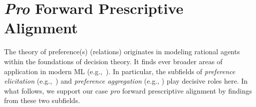 \documentclass{article}
\theoremstyle{plain}
\theoremstyle{definition}
\theoremstyle{remark}
\begin{document}













\section{\textit{Pro} Forward Prescriptive Alignment}\label{sec:prescriptive}

The theory of preference(s) (relations) originates in modeling rational agents within the foundations of decision theory. It finds ever broader areas of application in modern ML (e.g.,~\citet{pl2003,JMLR:v24:22-0902,pmlr-v216-jansen23a,JMLR:v22:18-546,jansen2024statistical,rodemann2023approximately,rodemann2023all,rodemann2025reciprocal,dietrich2024semi,kim2024queueing}). In particular, the subfields of \textit{preference elicitation} (e.g.,~\citet{haddaway,baarslag2015,mukherjee2024optimal}) and \textit{preference aggregation} (e.g., \citet{ehl2012,mptbw2015,JANSEN201849,pmlr-v235-zhang24u}) play decisive roles here. %
In what follows, we support our case \textit{pro} forward prescriptive alignment by findings from these two subfields. 
\end{document}
